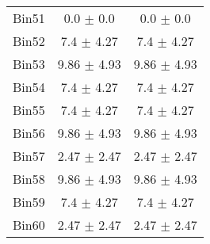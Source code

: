 \begin{tabular}{|c|c|c|}
     Bin51 & 0.0 $\pm$ 0.0 & 0.0 $\pm$ 0.0 \\ \cline{1-3} 
     Bin52 & 7.4 $\pm$ 4.27 & 7.4 $\pm$ 4.27 \\ \cline{1-3} 
     Bin53 & 9.86 $\pm$ 4.93 & 9.86 $\pm$ 4.93 \\ \cline{1-3} 
     Bin54 & 7.4 $\pm$ 4.27 & 7.4 $\pm$ 4.27 \\ \cline{1-3} 
     Bin55 & 7.4 $\pm$ 4.27 & 7.4 $\pm$ 4.27 \\ \cline{1-3} 
     Bin56 & 9.86 $\pm$ 4.93 & 9.86 $\pm$ 4.93 \\ \cline{1-3} 
     Bin57 & 2.47 $\pm$ 2.47 & 2.47 $\pm$ 2.47 \\ \cline{1-3} 
     Bin58 & 9.86 $\pm$ 4.93 & 9.86 $\pm$ 4.93 \\ \cline{1-3} 
     Bin59 & 7.4 $\pm$ 4.27 & 7.4 $\pm$ 4.27 \\ \cline{1-3} 
     Bin60 & 2.47 $\pm$ 2.47 & 2.47 $\pm$ 2.47 \\ \cline{1-3} 
  \end{tabular}
